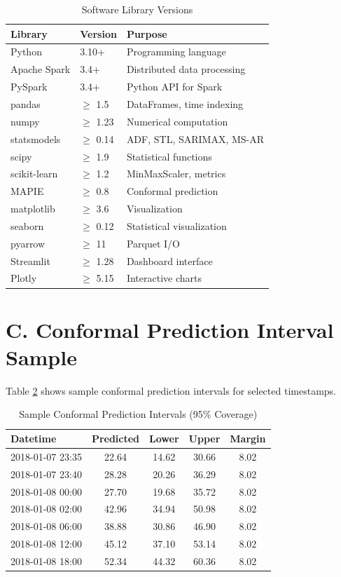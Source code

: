 \documentclass[12pt]{report}
\begin{document}
\begin{table}[H]
\centering
\caption{Software Library Versions}
\label{tab:software}
\begin{tabular}{lll}
\toprule
\textbf{Library} & \textbf{Version} & \textbf{Purpose} \\
\midrule
Python & 3.10+ & Programming language \\
Apache Spark & 3.4+ & Distributed data processing \\
PySpark & 3.4+ & Python API for Spark \\
pandas & $\geq$ 1.5 & DataFrames, time indexing \\
numpy & $\geq$ 1.23 & Numerical computation \\
statsmodels & $\geq$ 0.14 & ADF, STL, SARIMAX, MS-AR \\
scipy & $\geq$ 1.9 & Statistical functions \\
scikit-learn & $\geq$ 1.2 & MinMaxScaler, metrics \\
MAPIE & $\geq$ 0.8 & Conformal prediction \\
matplotlib & $\geq$ 3.6 & Visualization \\
seaborn & $\geq$ 0.12 & Statistical visualization \\
pyarrow & $\geq$ 11 & Parquet I/O \\
Streamlit & $\geq$ 1.28 & Dashboard interface \\
Plotly & $\geq$ 5.15 & Interactive charts \\
\bottomrule
\end{tabular}
\end{table}

\section*{C. Conformal Prediction Interval Sample}

Table \ref{tab:conformal_sample} shows sample conformal prediction intervals for selected timestamps.

\begin{table}[H]
\centering
\caption{Sample Conformal Prediction Intervals (95\% Coverage)}
\label{tab:conformal_sample}
\begin{tabular}{lcccc}
\toprule
\textbf{Datetime} & \textbf{Predicted} & \textbf{Lower} & \textbf{Upper} & \textbf{Margin} \\
\midrule
2018-01-07 23:35 & 22.64 & 14.62 & 30.66 & 8.02 \\
2018-01-07 23:40 & 28.28 & 20.26 & 36.29 & 8.02 \\
2018-01-08 00:00 & 27.70 & 19.68 & 35.72 & 8.02 \\
2018-01-08 02:00 & 42.96 & 34.94 & 50.98 & 8.02 \\
2018-01-08 06:00 & 38.88 & 30.86 & 46.90 & 8.02 \\
2018-01-08 12:00 & 45.12 & 37.10 & 53.14 & 8.02 \\
2018-01-08 18:00 & 52.34 & 44.32 & 60.36 & 8.02 \\
\bottomrule
\end{tabular}
\end{table}
\end{document}
